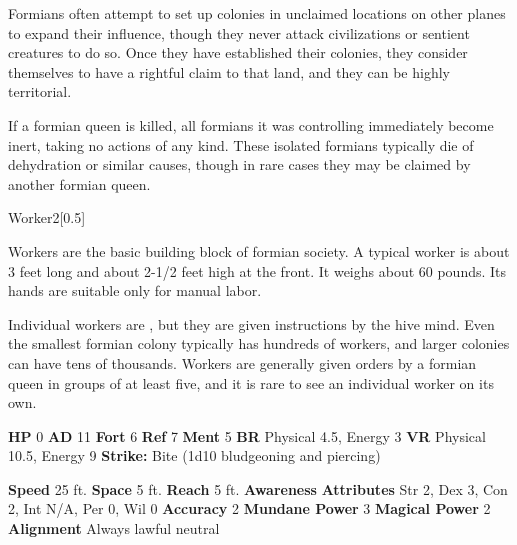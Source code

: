       Formians often attempt to set up colonies in unclaimed locations on other planes to expand their influence, though they never attack civilizations or sentient creatures to do so.
      Once they have established their colonies, they consider themselves to have a rightful claim to that land, and they can be highly territorial.

      If a formian queen is killed, all formians it was controlling immediately become inert, taking no actions of any kind.
      These isolated formians typically die of dehydration or similar causes, though in rare cases they may be claimed by another formian queen.
    

      
  \begin{monsubsection}{Worker}{2}[0.5]
    \vspace{-1em}\vspace{-1em}
    \vspace{0em}

    
          Workers are the basic building block of formian society.
          A typical worker is about 3 feet long and about 2-1/2 feet high at the front.
          It weighs about 60 pounds.
          Its hands are suitable only for manual labor.
        
          Individual workers are , but they are given instructions by the hive mind.
          Even the smallest formian colony typically has hundreds of workers, and larger colonies can have tens of thousands.
          Workers are generally given orders by a formian queen in groups of at least five, and it is rare to see an individual worker on its own.
        

    \begin{spellcontent}
      \begin{spelltargetinginfo}
        \pari \textbf{HP} 0 \monsep
          \textbf{AD} 11 \monsep
          \textbf{Fort} 6 \monsep
          \textbf{Ref} 7 \monsep
          \textbf{Ment} 5
        \pari \textbf{BR} Physical 4.5, Energy 3 \monsep
        \textbf{VR} Physical 10.5, Energy 9
        \pari \textbf{Strike:}
            Bite  (1d10 bludgeoning and piercing)
      \end{spelltargetinginfo}
    \end{spellcontent}
    \begin{monsterfooter}
      \pari \textbf{Speed} 25 ft. \monsep
        \textbf{Space} 5 ft. \monsep
        \textbf{Reach} 5 ft.
      \pari \textbf{Awareness} 
      \pari \textbf{Attributes}
        Str 2, Dex 3,
        Con 2, Int N/A,
        Per 0, Wil 0
      \pari \textbf{Accuracy} 2 \monsep
        \textbf{Mundane Power} 3 \monsep
      \textbf{Magical Power} 2
      \pari \textbf{Alignment} Always lawful neutral
    \end{monsterfooter}
  \end{monsubsection}

